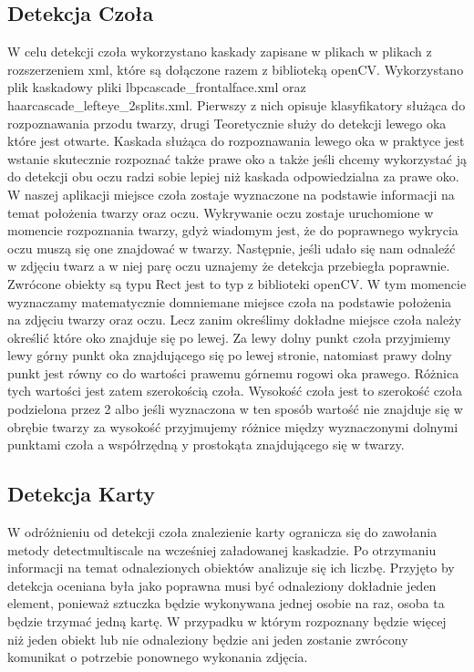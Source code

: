 \documentclass{article}
\numberwithin{equation}{section}
\begin{document}
\subsection{Detekcja Czoła}

W celu detekcji czoła wykorzystano kaskady zapisane w plikach w plikach z rozszerzeniem xml, które są dołączone razem z biblioteką openCV. Wykorzystano plik kaskadowy pliki lbpcascade\_frontalface.xml oraz haarcascade\_lefteye\_2splits.xml.
Pierwszy z nich opisuje klasyfikatory służąca do rozpoznawania przodu twarzy, drugi 
Teoretycznie służy do detekcji lewego oka które jest otwarte. Kaskada służąca do rozpoznawania lewego oka w praktyce jest wstanie skutecznie rozpoznać także prawe oko a także jeśli chcemy wykorzystać ją do detekcji obu oczu radzi sobie lepiej niż kaskada odpowiedzialna za prawe oko. W naszej aplikacji miejsce czoła zostaje wyznaczone na podstawie informacji na temat położenia twarzy oraz oczu. Wykrywanie oczu zostaje uruchomione w momencie rozpoznania twarzy, gdyż wiadomym jest, że do poprawnego wykrycia oczu muszą się one znajdować w twarzy. 
Następnie, jeśli udało się nam odnaleźć w zdjęciu twarz a w niej parę oczu uznajemy że detekcja przebiegła poprawnie. Zwrócone obiekty są typu Rect jest to typ z biblioteki openCV. W tym momencie wyznaczamy matematycznie domniemane miejsce czoła na podstawie położenia na zdjęciu twarzy oraz oczu. Lecz zanim określimy dokładne miejsce czoła należy określić które oko znajduje się po lewej.
Za lewy dolny punkt czoła przyjmiemy lewy górny punkt oka znajdującego się po lewej stronie, natomiast prawy dolny punkt jest równy co do wartości prawemu górnemu rogowi oka prawego. Różnica tych wartości jest zatem szerokością czoła. Wysokość czoła jest to szerokość czoła podzielona przez 2 albo jeśli wyznaczona w ten sposób wartość nie znajduje się w obrębie twarzy za wysokość przyjmujemy różnice między wyznaczonymi dolnymi punktami czoła a współrzędną y prostokąta znajdującego się w twarzy.


\subsection{Detekcja Karty}

W odróżnieniu od detekcji czoła znalezienie karty ogranicza się do zawołania metody detectmultiscale na wcześniej załadowanej kaskadzie. Po otrzymaniu informacji na temat odnalezionych obiektów analizuje się ich liczbę. Przyjęto by detekcja oceniana była jako poprawna musi być odnaleziony dokładnie jeden element, ponieważ sztuczka będzie wykonywana jednej osobie na raz, osoba ta będzie trzymać jedną kartę. W przypadku w którym rozpoznany będzie więcej niż jeden obiekt lub nie odnaleziony będzie ani jeden zostanie zwrócony komunikat o potrzebie ponownego wykonania zdjęcia.
\end{document}

